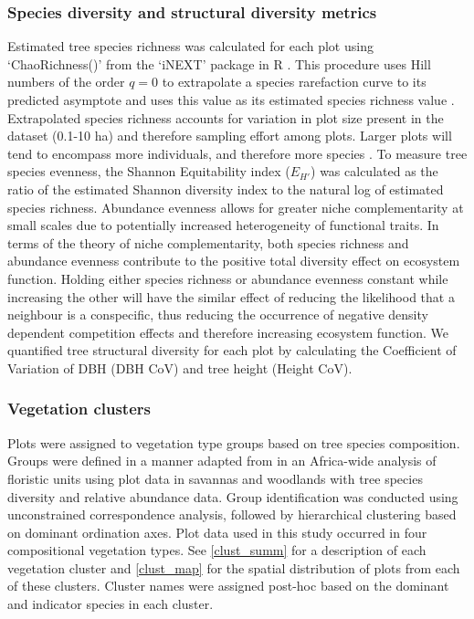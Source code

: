 \documentclass[12pt,a4paper]{article}
\begin{document}
\subsubsection{Species diversity and structural diversity metrics}

Estimated tree species richness was calculated for each plot using `ChaoRichness()' from the `iNEXT' package in R \citep{Hsieh2016}. This procedure uses Hill numbers of the order $q=0$ to extrapolate a species rarefaction curve to its predicted asymptote and uses this value as its estimated species richness value \citep{Jost2006}. Extrapolated species richness accounts for variation in plot size present in the dataset (0.1-10 ha) and therefore sampling effort among plots. Larger plots will tend to encompass more individuals, and therefore more species \citep{Dengler2009}. To measure tree species evenness, the Shannon Equitability index ($E_{H'}$) \citep{Smith1996} was calculated as the ratio of the estimated Shannon diversity index to the natural log of estimated species richness. Abundance evenness allows for greater niche complementarity at small scales due to potentially increased heterogeneity of functional traits. In terms of the theory of niche complementarity, both species richness and abundance evenness contribute to the positive total diversity effect on ecosystem function. Holding either species richness or abundance evenness constant while increasing the other will have the similar effect of reducing the likelihood that a neighbour is a conspecific, thus reducing the occurrence of negative density dependent competition effects and therefore increasing ecosystem function. We quantified tree structural diversity for each plot by calculating the Coefficient of Variation of DBH (DBH CoV) and tree height (Height CoV). 

\subsubsection{Vegetation clusters}

Plots were assigned to vegetation type groups based on tree species composition. Groups were defined in a manner adapted from \citet{Fayolle2018} in an Africa-wide analysis of floristic units using plot data in savannas and woodlands with tree species diversity and relative abundance data. Group identification was conducted using unconstrained correspondence analysis, followed by hierarchical clustering based on dominant ordination axes. Plot data used in this study occurred in four compositional vegetation types. See \autoref{clust_summ} for a description of each vegetation cluster and \autoref{clust_map} for the spatial distribution of plots from each of these clusters. Cluster names were assigned post-hoc based on the dominant and indicator species in each cluster.
\end{document}
